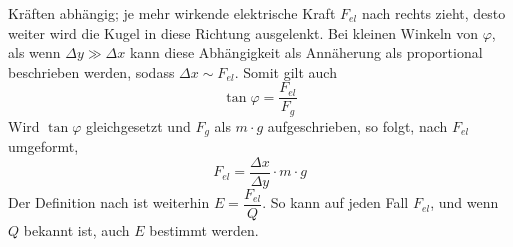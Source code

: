 \documentclass{article}
\begin{document}
\noindent Kräften abhängig; je mehr wirkende elektrische Kraft $F_{el}$ nach rechts zieht, desto weiter wird die Kugel in diese Richtung ausgelenkt. Bei kleinen Winkeln von $\varphi$, als wenn $\Delta y \gg \Delta x$ kann diese Abhängigkeit als Annäherung als proportional beschrieben werden, sodass $\Delta x \sim F_{el}$. Somit gilt auch
\[
 \tan{\varphi} = \frac{F_{el}}{F_g} 
\]
Wird $\tan{\varphi}$ gleichgesetzt und $F_g$ als $m \cdot g$ aufgeschrieben, so folgt, nach $F_{el}$ umgeformt,
\[
 F_{el} = \frac{\Delta x}{\Delta y} \cdot m \cdot g
\]
Der Definition nach ist weiterhin $E = \dfrac{F_{el}}{Q}$. So kann auf jeden Fall $F_{el}$, und wenn $Q$ bekannt ist, auch $E$ bestimmt werden.
 
\end{document}
